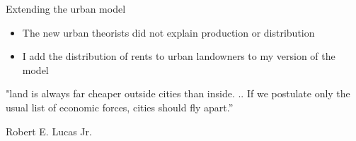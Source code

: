 \documentclass[]{beamer} %
\begin{document}
\begin{frame}{Extending the urban model}
\begin{itemize}\Large
    \item The new urban theorists did not explain production or distribution
    \item I add the distribution of rents to urban landowners to my version of the model
\end{itemize}
\end{frame}














\begin{frame}{}
\color{black!35!blue}
    \Large 
    "land is always far cheaper outside cities than inside. .. If we postulate only the usual list of economic forces, cities should fly apart.”
    
    \vspace{.4cm}
    
    \hfill Robert E. Lucas Jr.

\end{frame}
\end{document}
